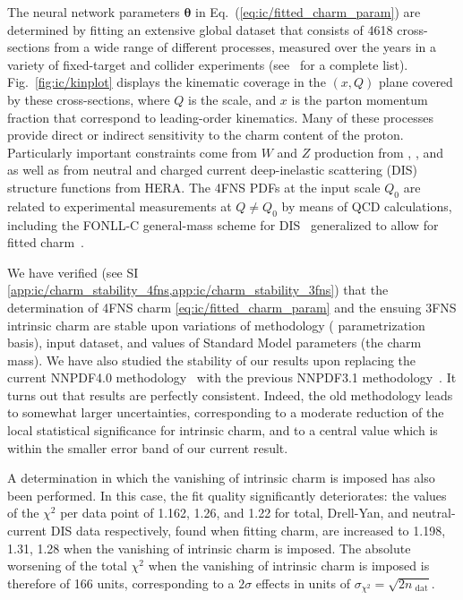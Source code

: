 The neural network parameters ${\boldsymbol \theta}$ in
Eq.~(\ref{eq:ic/fitted_charm_param})
are determined by fitting an extensive global dataset that consists of 4618 
cross-sections from a wide range of different processes, measured over
the years in a variety of fixed-target and collider experiments  (see~\cite{Ball:2021leu} for a complete list).
%
Fig.~\ref{fig:ic/kinplot} displays the kinematic coverage in the $(x,Q)$ plane
covered by these cross-sections, where $Q$ is
the  scale, and  $x$ is
the parton momentum fraction that correspond to leading-order kinematics.
%
Many of these processes provide direct or indirect sensitivity 
to the charm content of the proton.
%
Particularly important constraints come from $W$ and $Z$ production from 
\atlas, \cms, and \lhcb as well as from
neutral and charged current deep-inelastic 
scattering (DIS) structure functions from HERA.
%
The 4FNS  PDFs at the input scale $Q_0$ are related
to experimental measurements at $Q \not =Q_0$ by means of \nnlo QCD calculations, including
the FONLL-C general-mass scheme for DIS~\cite{Forte:2010ta} generalized to 
allow for fitted charm~\cite{Ball:2015tna}.

We have verified (see SI
\cref{app:ic/charm_stability_4fns,app:ic/charm_stability_3fns}) that the
determination of 4FNS charm \pdf \cref{eq:ic/fitted_charm_param} and the ensuing
3FNS intrinsic charm \pdf are  stable upon variations of methodology (\pdf
parametrization basis), input dataset, and values of Standard Model parameters
(the charm mass).
We have also studied the stability of our results upon replacing the
current NNPDF4.0 methodology~\cite{Ball:2021leu} with the previous
NNPDF3.1 methodology~\cite{NNPDF:2017mvq}. It turns out that results
are  perfectly consistent. Indeed, the old methodology leads to somewhat larger
uncertainties, corresponding to a moderate reduction of the local statistical
significance for intrinsic charm, and to a central value which is
within the smaller  error band of our current result.


A determination in which the vanishing of intrinsic charm is
imposed has also been performed.
%
In this case, the fit quality significantly
deteriorates: the values of the $\chi^2$ per data point of 1.162,
1.26, and 1.22 for total, Drell-Yan, 
and neutral-current DIS data respectively, found when fitting charm, are 
increased to 1.198, 1.31, 1.28 when the vanishing of intrinsic charm
is imposed.
%
The absolute worsening of the total $\chi^2$ when the vanishing of intrinsic charm is imposed is therefore
of 166 units, corresponding to
a $2\sigma$ effects in units of $\sigma_{\chi^2}= \sqrt{2n_\textrm{ dat}}$.

